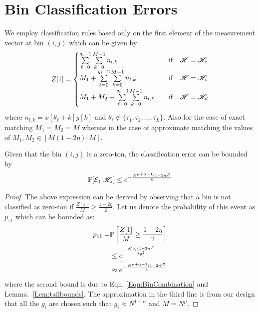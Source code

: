 \section{Bin Classification Errors}
\label{Append:BinClassif}
We employ classification rules based only on the first element of the measurement vector at bin $(i,j)$ which can be given by
\begin{align}
Z[1]=\begin{cases}
\sum\limits_{\ell=0}^{g_{i}-1}\sum\limits_{k=0}^{M-1} n_{l,k}  & ~~\text{ if } ~~ \msc{H}=\msc{H}_z\label{Eqn:BinCombination}\\
\vspace{\vgap}
M_1+\sum\limits_{\ell=0}^{g_{i}-2}\sum\limits_{k=0}^{M-1} n_{l,k}  & ~~\text{ if } ~~ \msc{H}=\msc{H}_s\\
\vspace{\vgap}
M_1+M_2+\sum\limits_{\ell=0}^{g_{i}-3}\sum\limits_{k=0}^{M-1} n_{l,k}  & ~~\text{ if } ~~ \msc{H}=\msc{H}_d\\
\end{cases}
\end{align}
where $n_{l,k}=x[\theta_{\ell}+k]y[k]$ and $\theta_{\ell}\notin\{\tau_1,\tau_2,\ldots,\tau_L\}$. Also for the case of exact matching $M_1=M_2=M$ whereas in the case of approximate matching the values of $M_1,M_2\in[M(1-2\eta):M]$.

\begin{lemma}
\label{Lem:ZerotonClassif}
Given that the bin $(i,j)$ is a zero-ton, the classification error can be bounded by
\begin{align*}
\mathbb{P}[\mathcal{E}_1|\mathscr{H}_z]\leq e^{-\frac{N^{\mu+\alpha-1}(1-2\eta)^2}{8}}
\end{align*}
\end{lemma}
\begin{proof}
The above expression can be derived by observing that a bin is not classified as zero-ton if $\frac{Z[1]}{M}\geq\frac{1-2\eta}{2}$. Let us denote the probability of this event as $p_{z1}$ which can be bounded as:
\begin{align*}
p_{z1}=&\mathbb{P}\left[\frac{Z[1]}{M}\geq\frac{1-2\eta}{2}\right]\\
&\leq e^{-\frac{Mg_i(1-2\eta)^2}{8g_i^{2}}}\\
&\approx e^{-\frac{N^{\mu+\alpha-1}(1-2\eta)^2}{8}}
\end{align*} 
where the second bound is due to Eqn. \eqref{Eqn:BinCombination} and Lemma.~\ref{Lem:tailbounds}. The approximation in the third line is from our design that all the $g_i$ are chosen such that $g_i\approx N^{1-\alpha}$ and $M=N^{\mu}.$
\end{proof}

